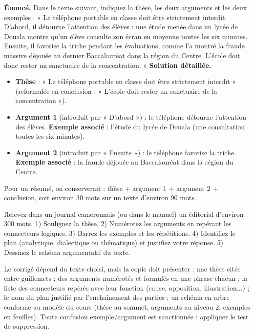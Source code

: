 \documentclass[11pt]{article}
\begin{document}
\begin{exoresolu}
\textbf{Énoncé.} Dans le texte suivant, indiquez la thèse, les deux arguments et les deux exemples : « Le téléphone portable en classe doit être strictement interdit. D'abord, il détourne l'attention des élèves : une étude menée dans un lycée de Douala montre qu'un élève consulte son écran en moyenne toutes les six minutes. Ensuite, il favorise la triche pendant les évaluations, comme l'a montré la fraude massive déjouée au dernier Baccalauréat dans la région du Centre. L'école doit donc rester un sanctuaire de la concentration. »
\tcblower
\textbf{Solution détaillée.}
\begin{itemize}
\item \textbf{Thèse} : « Le téléphone portable en classe doit être strictement interdit » (reformulée en conclusion : « L'école doit rester un sanctuaire de la concentration »).
\item \textbf{Argument 1} (introduit par « D'abord ») : le téléphone détourne l'attention des élèves. \textbf{Exemple associé} : l'étude du lycée de Douala (une consultation toutes les six minutes).
\item \textbf{Argument 2} (introduit par « Ensuite ») : le téléphone favorise la triche. \textbf{Exemple associé} : la fraude déjouée au Baccalauréat dans la région du Centre.
\end{itemize}
Pour un résumé, on conserverait : thèse + argument 1 + argument 2 + conclusion, soit environ 30 mots sur un texte d'environ 90 mots.
\end{exoresolu}

\begin{exercice}
Relevez dans un journal camerounais (ou dans le manuel) un éditorial d'environ 300 mots. 1) Soulignez la thèse. 2) Numérotez les arguments en repérant les connecteurs logiques. 3) Barrez les exemples et les répétitions. 4) Identifiez le plan (analytique, dialectique ou thématique) et justifiez votre réponse. 5) Dessinez le schéma argumentatif du texte.
\end{exercice}

\begin{corrige}
Le corrigé dépend du texte choisi, mais la copie doit présenter : une thèse citée entre guillemets ; des arguments numérotés et formulés en une phrase chacun ; la liste des connecteurs repérés avec leur fonction (cause, opposition, illustration...) ; le nom du plan justifié par l'enchaînement des parties ; un schéma en arbre conforme au modèle du cours (thèse au sommet, arguments au niveau 2, exemples en feuilles). Toute confusion exemple/argument est sanctionnée : appliquer le test de suppression.
\end{corrige}
\end{document}
